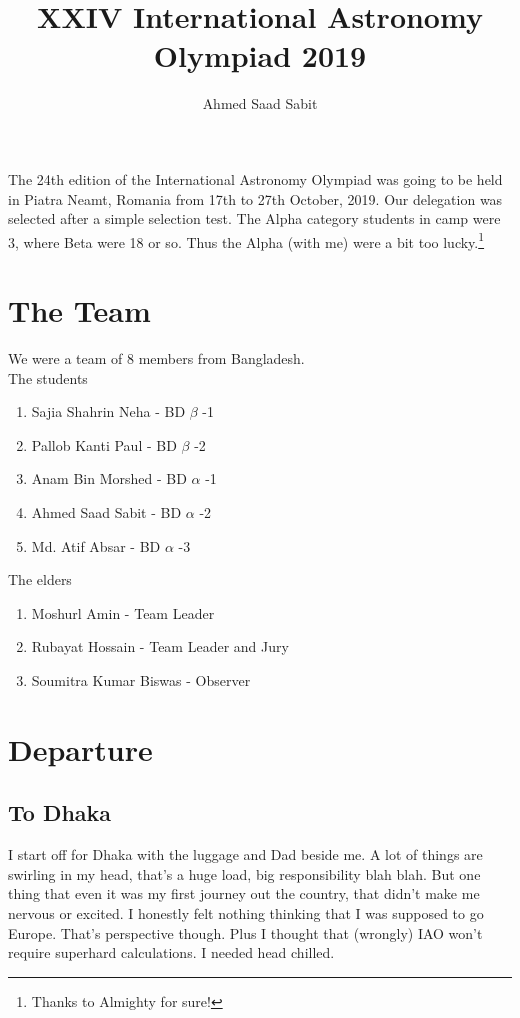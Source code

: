 \documentclass[11pt,a4paper]{article}
\author{Ahmed Saad Sabit}
\title{XXIV International Astronomy Olympiad 2019}
\begin{document}
\maketitle
The 24th edition of the International Astronomy Olympiad was going to be held in Piatra Neamt, Romania from 17th to 27th October, 2019. Our delegation was selected after a simple selection test. The Alpha category students in camp were 3, where Beta were 18 or so. Thus the Alpha (with me) were a bit too lucky.\footnote{Thanks to Almighty for sure!}
\section{The Team}
We were a team of 8 members from Bangladesh.  \\
The students
\begin{enumerate}
\item Sajia Shahrin Neha - BD $\beta$ -1
\item Pallob Kanti Paul - BD $\beta$ -2
\item Anam Bin Morshed - BD $\alpha$ -1
\item Ahmed Saad Sabit - BD $\alpha$ -2
\item Md. Atif Absar - BD $\alpha$ -3
\end{enumerate}
The elders
\begin{enumerate}
\item Moshurl Amin - Team Leader
\item Rubayat Hossain - Team Leader and Jury
\item Soumitra Kumar Biswas - Observer
\end{enumerate}
\section{Departure}
\subsection{To Dhaka}
I start off for Dhaka with the luggage and Dad beside me. A lot of things are swirling in my head, that's a huge load, big responsibility blah blah. But one thing that even it was my first journey out the country, that didn't make me nervous or excited. I honestly felt nothing thinking that I was supposed to go Europe. That's perspective though. Plus I thought that (wrongly) IAO won't require superhard calculations. I needed head chilled. 
\end{document}
